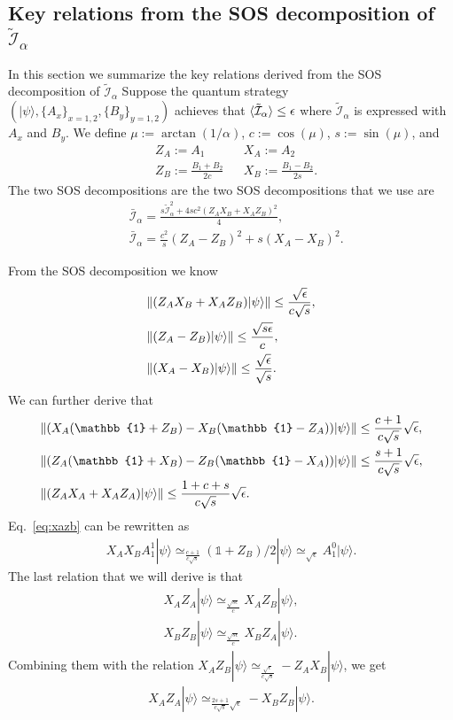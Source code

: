 \documentclass[11pt,letterpaper]{article}
\newcommand{\ket}[1]{|#1\rangle}
\DeclarePairedDelimiter{\norm}{\lVert}{\rVert}
\DeclarePairedDelimiter{\ip}{\langle}{\rangle}
\newcommand{\1}{\mathbb{1}}
\newcommand{\I}{\mathcal{I}}
\newcommand{\appd}[1]{\simeq_{#1}}
\theoremstyle{definition}
\begin{document}
\subsection{Key relations from the SOS decomposition of $\tilde{\I}_\alpha$}
In this section we summarize the key relations derived from the SOS decomposition of $\tilde{\I}_\alpha$
Suppose the quantum strategy $(\ket{\psi}, \{A_x\}_{x=1,2}, \{B_{y }\}_{y=1,2})$ achieves that 
$\ip{\tilde{\I}_\alpha} \leq \epsilon$ where
$\tilde{\I}_\alpha$ is expressed with $A_x$ and $B_y$.
We define $\mu := \arctan(1/\alpha)$, $c := \cos(\mu)$, $s := \sin(\mu)$, and
\begin{align}
	&Z_A := A_1 && X_A := A_2\\
	&Z_B := \frac{B_1+B_2}{2c} && X_B := \frac{B_1-B_2}{2s}.
\end{align}
The two SOS decompositions are 
the two SOS decompositions that we use are
\begin{align}
	\label{eq:sos1}&\bar{\I}_\alpha = \frac{s \tilde{\I}_\alpha^2 + 4sc^2(Z_AX_B+X_AZ_B)^2}{4},\\
	\label{eq:sos2}&\bar{\I}_\alpha = \frac{c^2}{s}(Z_A-Z_B)^2 + s (X_A-X_B)^2.
\end{align}

From the SOS decomposition we know 
\begin{align}
	&\norm{(Z_AX_B+X_AZ_B)\ket{\psi}} \leq \frac{\sqrt{\epsilon}}{c\sqrt{s}},\\
	\label{eq:za-zb}&\norm{(Z_A-Z_B)\ket{\psi}} \leq \frac{\sqrt{s\epsilon}}{c},\\
	&\norm{(X_A-X_B)\ket{\psi}} \leq \frac{\sqrt{\epsilon}}{\sqrt{s}}.
\end{align}
We can further derive that 
\begin{align}
	\label{eq:xazb}&\norm{(X_A(\1+Z_B)-X_B(\1-Z_A))\ket{\psi}} \leq \frac{c+1}{c\sqrt{s}} \sqrt{\epsilon},\\
	\label{eq:zaxb}&\norm{(Z_A(\1+X_B)-Z_B(\1-X_A))\ket{\psi}}\leq \frac{s+1}{c\sqrt{s}} \sqrt{\epsilon},\\
	\label{eq:zaxa}&\norm{(Z_AX_A+X_AZ_A)\ket{\psi}} \leq \frac{1+c+s}{c\sqrt{s}} \sqrt{\epsilon}.
\end{align}
Eq.~\ref{eq:xazb} can be rewritten as 
\begin{align}
	X_AX_BA_1^1 \ket{\psi} \appd{\frac{c+1}{c\sqrt{s}}} (\1+Z_B)/2 \ket{\psi} \appd{\sqrt{\epsilon}} A_1^0 \ket{\psi}.
\end{align}
The last relation that we will derive is that 
\begin{align}
	X_AZ_A \ket{\psi} \appd{\frac{\sqrt{s\epsilon}}{c}} X_AZ_B \ket{\psi},\\
	X_BZ_B \ket{\psi} \appd{\frac{\sqrt{s\epsilon}}{c}} X_BZ_A\ket{\psi}.
\end{align}
Combining them with the relation $X_AZ_B \ket{\psi} \appd{\frac{\sqrt{\epsilon}}{c\sqrt{s}}} -Z_AX_B\ket{\psi}$,
we get 
\begin{align}
	X_AZ_A \ket{\psi} \appd{\frac{2s+1}{c\sqrt{s}} \sqrt{\epsilon}} -X_BZ_B \ket{\psi}.
\end{align}
\end{document}
